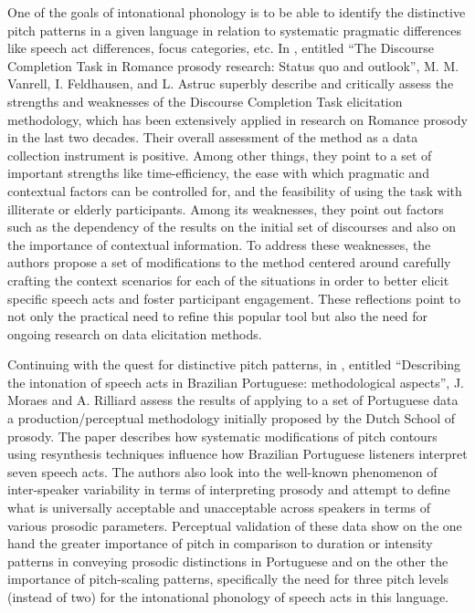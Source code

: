 \documentclass[output=paper]{langsci/langscibook}
\begin{document}
One of the goals of intonational phonology is to be able to identify the distinctive pitch patterns in a given language in relation to systematic pragmatic differences like speech act differences, focus categories, etc. In \textbf{}, entitled “The Discourse Completion Task in Romance prosody research: Status quo and outlook”, M. M. Vanrell, I. Feldhausen, and L. Astruc superbly describe and critically assess the strengths and weaknesses of the Discourse Completion Task elicitation methodology, which has been extensively applied in research on Romance prosody in the last two decades. Their overall assessment of the method as a data collection instrument is positive. Among other things, they point to a set of important strengths like time-efficiency, the ease with which pragmatic and contextual factors can be controlled for, and the feasibility of using the task with illiterate or elderly participants. Among its weaknesses, they point out factors such as the dependency of the results on the initial set of discourses and also on the importance of contextual information. To address these weaknesses, the authors propose a set of modifications to the method centered around carefully crafting the context scenarios for each of the situations in order to better elicit specific speech acts and foster participant engagement. These reflections point to not only the practical need to refine this popular tool but also the need for ongoing research on data elicitation methods. 

Continuing with the quest for distinctive pitch patterns, in \textbf{}, entitled ``Describing the intonation of speech acts in Brazilian Portuguese: methodological aspects”, J. Moraes and A. Rilliard assess the results of applying to a set of Portuguese data a production/perceptual methodology initially proposed by the Dutch School of prosody. The paper describes how systematic modifications of pitch contours using resynthesis techniques influence how Brazilian Portuguese listeners interpret seven speech acts. The authors also look into the well-known phenomenon of inter-speaker variability in terms of interpreting prosody and attempt to define what is universally acceptable and unacceptable across speakers in terms of various prosodic parameters. Perceptual validation of these data show on the one hand the greater importance of pitch in comparison to duration or intensity patterns in conveying prosodic distinctions in Portuguese and on the other the importance of pitch-scaling patterns, specifically the need for three pitch levels (instead of two) for the intonational phonology of speech acts in this language. 
\end{document}
